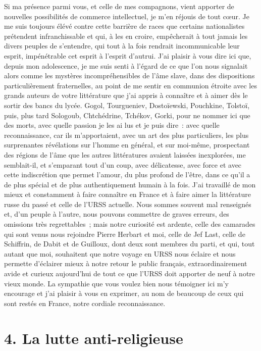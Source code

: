 \documentclass[french,twoside]{book} %
\begin{document}
Si ma présence parmi vous, et celle de mes compagnons, vient apporter de nouvelles possibilités de commerce intellectuel, je m’en réjouis de tout cœur. Je me suis toujours élévé contre cette barrière de races que certains nationalistes prétendent infranchissable et qui, à les en croire, empêcherait à tout jamais les divers peuples de s’entendre, qui tout à la fois rendrait incommunicable leur esprit, impénétrable cet esprit à l’esprit d’autrui. J’ai plaisir à vous dire ici que, depuis mon adolescence, je me suis senti à l’égard de ce que l’on nous signalait alors comme les mystères incompréhensibles de l’âme slave, dans des dispositions particulièrement fraternelles, au point de me sentir en communion étroite avec les grands auteurs de votre littérature que j’ai appris à connaître et à aimer dès le sortir des bancs du lycée. Gogol, Tourgueniev, Dostoïewski, Pouchkine, Tolstoï, puis, plus tard Sologoub, Chtchédrine, Tchékov, Gorki, pour ne nommer ici que des morts, avec quelle passion je les ai lus et je puis dire : avec quelle reconnaissance, car ils m’apportaient, avec un art des plus particuliers, les plus surprenantes révélations sur l’homme en général, et sur moi-même, prospectant des régions de l’âme que les autres littératures avaient laissées inexplorées, me semblait-il, et s’emparant tout d’un coup, avec délicatesse, avec force et avec cette indiscrétion que permet l’amour, du plus profond de l’être, dans ce qu’il a de plus spécial et de plus authentiquement humain à la fois. J’ai travaillé de mon mieux et constamment à faire connaître en France et à faire aimer la littérature russe du passé et celle de l’URSS actuelle. Nous sommes souvent mal renseignés et, d’un peuple à l’autre, nous pouvons commettre de graves erreurs, des omissions très regrettables ; mais notre curiosité est ardente, celle des camarades qui sont venus nous rejoindre Pierre Herbart et moi, celle de Jef Last, celle de Schiffrin, de Dabit et de Guilloux, dont deux sont membres du parti, et qui, tout autant que moi, souhaitent que notre voyage en URSS nous éclaire et nous permette d’éclairer mieux à notre retour le public français, extraordinairement avide et curieux aujourd’hui de tout ce que l’URSS doit apporter de neuf à notre vieux monde. La sympathie que vous voulez bien nous témoigner ici m’y encourage et j’ai plaisir à vous en exprimer, au nom de beaucoup de ceux qui sont restés en France, notre cordiale reconnaissance.

\section[{4. La lutte anti-religieuse}]{4. La lutte anti-religieuse}
\end{document}
